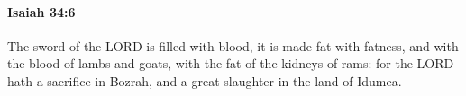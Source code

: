 \begin{framed}
\begin{compactdesc}
\begin{compactenum}
						\end{compactenum}
				\end{compactdesc}
			\end{framed}

		\paragraph{Isaiah 34:6} %
			\label{ISAIAH-34-6}

			The sword of the LORD is filled with blood, it is made fat with fatness, and with the blood of lambs and goats, with the fat of the kidneys of rams: for the LORD hath a sacrifice in Bozrah, and a great slaughter in the land of Idumea.


